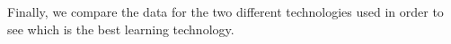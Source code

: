\documentclass[12pt, openany, twocolumn]{article}
\begin{document}
        \begin{figure}
            \caption{}
        \end{figure}

                    
        \begin{figure}
            \caption{}
        \end{figure}

        
        \begin{figure}
            \caption{}
        \end{figure}


        \begin{figure}
            \caption{}
        \end{figure}

        \begin{figure}
            \caption{}
        \end{figure}

                    
        \begin{figure}
            \caption{}
        \end{figure}

        
        \begin{figure}
            \caption{}
        \end{figure}



    Finally, we compare the data for the two different technologies used in order to see which is the best learning technology. \\


        \begin{figure}
            \caption{}
        \end{figure}

        \begin{figure}
            \caption{}
        \end{figure}
\end{document}
